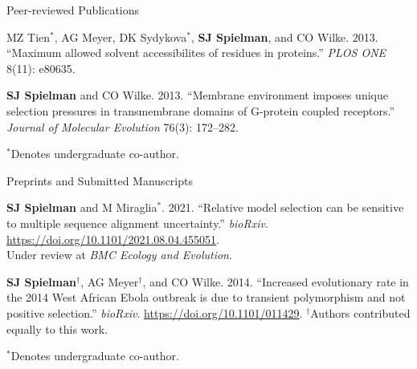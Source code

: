 \documentclass{resume} %
\begin{document}
\begin{rSection}{Peer-reviewed Publications}
\begin{etaremune}[leftmargin=1.5em]
\item MZ Tien$^\ast$, AG Meyer, DK Sydykova$^\ast$, \textbf{SJ Spielman}, and CO Wilke. 2013. ``Maximum allowed solvent accessibilites of residues in proteins.'' \emph{PLOS ONE} 8(11): e80635.

\item \textbf{SJ Spielman} and CO Wilke. 2013. ``Membrane environment imposes unique selection pressures in transmembrane domains of G-protein coupled receptors.'' \emph{Journal of Molecular Evolution} 76(3): 172--282.

\end{etaremune}

$^\ast$Denotes undergraduate co-author.
\end{rSection}



\vspace*{0.35cm}
\begin{rSection}{Preprints and Submitted Manuscripts}
\vspace*{0.25cm}

\begin{etaremune}[leftmargin=1.5em]

\item \textbf{SJ Spielman} and M Miraglia$^\ast$. 2021. ``Relative model selection can be sensitive to multiple sequence alignment uncertainty.'' \emph{bioRxiv}. \url{https://doi.org/10.1101/2021.08.04.455051}. \\
Under review at \emph{BMC Ecology and Evolution}.


\item \textbf{SJ Spielman}$^\dagger$, AG Meyer$^\dagger$, and CO Wilke. 2014. ``Increased evolutionary rate in the 2014 West African Ebola outbreak is due to transient polymorphism and not positive selection.'' \emph{bioRxiv}. \url{https://doi.org/10.1101/011429}. $^\dagger$Authors contributed equally to this work.

\end{etaremune}


$^\ast$Denotes undergraduate co-author.

\end{rSection}



\end{document}
